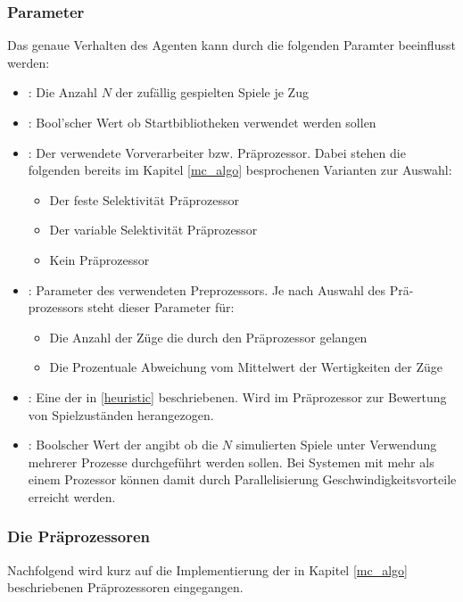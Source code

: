 \subsubsection{Parameter}
Das genaue Verhalten des Agenten kann durch die folgenden Paramter beeinflusst werden: 
\begin{itemize}
\item {}: Die Anzahl $N$ der zufällig gespielten Spiele je Zug
\item {}: Bool'scher Wert ob Startbibliotheken verwendet werden sollen
\item {}: Der verwendete Vorverarbeiter bzw. Präprozessor. Dabei stehen die folgenden bereits im Kapitel \ref{mc_algo} besprochenen Varianten zur Auswahl:
\begin{itemize}
    \item Der feste Selektivität Präprozessor
    \item Der variable Selektivität Präprozessor
    \item Kein Präprozessor
\end{itemize}
\item {}: Parameter des verwendeten Preprozessors. Je nach Auswahl des Prä-\\prozessors steht dieser Parameter für:
\begin{itemize}
    \item Die Anzahl der Züge die durch den Präprozessor gelangen
    \item Die Prozentuale Abweichung vom Mittelwert der Wertigkeiten der Züge
\end{itemize}
\item {}: Eine der in \ref{heuristic} beschriebenen. Wird im Präprozessor zur Bewertung von Spielzuständen herangezogen.
\item {}: Boolscher Wert der angibt ob die $N$ simulierten Spiele unter Verwendung mehrerer Prozesse durchgeführt werden sollen. Bei Systemen mit mehr als einem Prozessor können damit durch Parallelisierung Geschwindigkeitsvorteile erreicht werden. 
\end{itemize}

\subsubsection{Die Präprozessoren}
Nachfolgend wird kurz auf die Implementierung der in Kapitel \ref{mc_algo} beschriebenen Präprozessoren eingegangen.
